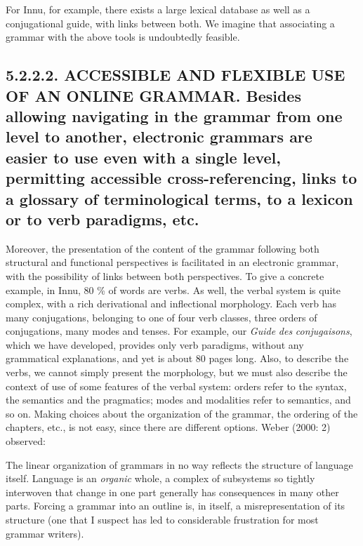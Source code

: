 \documentclass[letterpaper]{article}
\begin{document}
For Innu, for example, there exists a  large lexical database  as well as a conjugational guide, with links between both. We imagine that associating a grammar with the above tools is undoubtedly feasible.

\subsection[5.2.2.2. ACCESSIBLE AND FLEXIBLE USE OF AN ONLINE GRAMMAR. Besides allowing navigating in the grammar from one level to another, electronic grammars are easier to use even with a single level, permitting accessible cross{}-referencing, links to a glossary of terminological terms, to a lexicon or to verb paradigms, etc. ]{5.2.2.2. ACCESSIBLE AND FLEXIBLE USE OF AN ONLINE GRAMMAR. \textmd{Besides }\textmd{allowing }\textmd{navigati}\textmd{ng}\textmd{ }\textmd{in}\textmd{ the grammar from one level to}\textmd{ }\textmd{an}\textmd{other, electronic grammars are }\textmd{easier }\textmd{to use even }\textmd{with a single}\textmd{ level}\textmd{, permitting accessible cross-referencing, links to a glossary of terminological terms, to a lexicon or }\textmd{to }\textmd{verb paradigms, etc. }}
Moreover, the presentation of the content of the grammar following both structural and functional perspectives is facilitated in an electronic grammar, with the possibility of links between both perspectives.  To give a concrete example, in Innu, 80 \% of words are verbs. As well, the verbal system is quite complex, with a rich derivational and inflectional morphology. Each verb has many conjugations, belonging to one of four verb classes, three orders of conjugations, many modes and tenses. For example, our \textit{Guide }\textit{de}\textit{s}\textit{ }\textit{conjuga}\textit{is}\textit{ons}, which we have developed, provides only verb paradigms, without any grammatical explanations, and yet is about 80 pages long. Also, to describe the verbs, we cannot simply present the morphology, but we must also describe the context of use of some features of the verbal system: orders refer to the syntax, the semantics and the pragmatics; modes and modalities refer to semantics, and so on. Making choices about the organization of the grammar, the ordering of the chapters, etc., is not easy, since there  are different options. Weber (2000: 2) observed:

The linear organization of grammars in no way reflects the structure of language itself. Language is an \textit{organic }whole, a complex of subsystems so tightly interwoven that change in one part generally has consequences in many other parts. Forcing a grammar into an outline is, in itself, a misrepresentation of its structure (one that I suspect has led to considerable frustration for most grammar writers).
\end{document}
